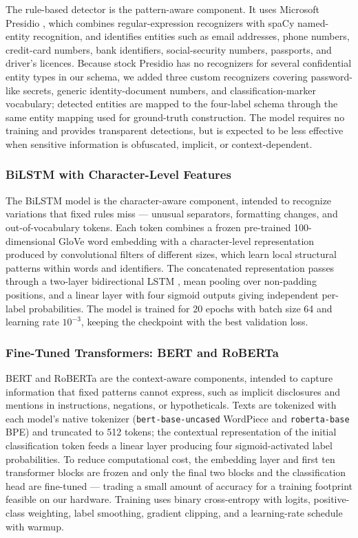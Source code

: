 \documentclass{article}
\begin{document}
The rule-based detector is the pattern-aware component. It uses
Microsoft Presidio \citep{presidio}, which combines regular-expression
recognizers with spaCy named-entity recognition, and identifies
entities such as email addresses, phone numbers, credit-card numbers,
bank identifiers, social-security numbers, passports, and driver's
licences. Because stock Presidio has no recognizers for several
confidential entity types in our schema, we added three custom
recognizers covering password-like secrets, generic identity-document
numbers, and classification-marker vocabulary; detected entities are
mapped to the four-label schema through the same entity mapping used
for ground-truth construction. The model requires no training and
provides transparent detections, but is expected to be less effective
when sensitive information is obfuscated, implicit, or
context-dependent.

\subsubsection{BiLSTM with Character-Level Features}
\label{subsubsec:bilstm}

The BiLSTM model is the character-aware component, intended to
recognize variations that fixed rules miss --- unusual separators,
formatting changes, and out-of-vocabulary tokens. Each token combines a
frozen pre-trained 100-dimensional GloVe word embedding
\citep{pennington2014glove} with a character-level representation
produced by convolutional filters of different sizes, which learn local
structural patterns within words and identifiers. The concatenated
representation passes through a two-layer bidirectional LSTM
\citep{hochreiter1997lstm}, mean pooling over non-padding positions,
and a linear layer with four sigmoid outputs giving independent
per-label probabilities. The model is trained for 20 epochs with batch
size 64 and learning rate $10^{-3}$, keeping the checkpoint with the
best validation loss.

\subsubsection{Fine-Tuned Transformers: BERT and RoBERTa}
\label{subsubsec:transformers}

BERT \citep{devlin2019bert} and RoBERTa \citep{liu2019roberta} are the
context-aware components, intended to capture information that fixed
patterns cannot express, such as implicit disclosures and mentions in
instructions, negations, or hypotheticals. Texts are tokenized with
each model's native tokenizer (\texttt{bert-base-uncased} WordPiece and
\texttt{roberta-base} BPE) and truncated to 512 tokens; the contextual
representation of the initial classification token feeds a linear layer
producing four sigmoid-activated label probabilities. To reduce
computational cost, the embedding layer and first ten transformer
blocks are frozen and only the final two blocks and the classification
head are fine-tuned --- trading a small amount of accuracy for a
training footprint feasible on our hardware. Training uses binary
cross-entropy with logits, positive-class weighting, label smoothing,
gradient clipping, and a learning-rate schedule with warmup.
\end{document}
